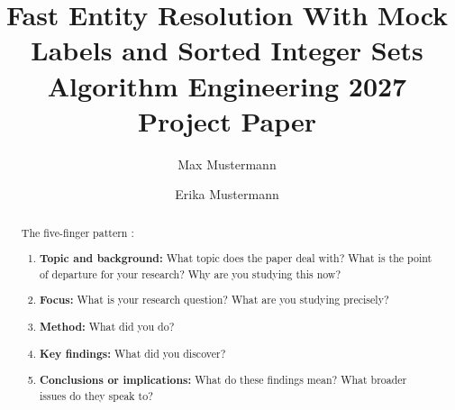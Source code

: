 \documentclass[sigconf]{acmart}
\begin{document}
\title[Fast Entity Resolution With Mock Labels and Sorted Integer Sets]{Fast Entity Resolution With Mock Labels and Sorted Integer Sets\\\large Algorithm Engineering 2027 Project Paper}


\author{Max Mustermann}

\author{Erika Mustermann}

\begin{abstract}

The five-finger pattern \cite{macgilchrist2014}:
\begin{enumerate}
\item \textbf{Topic and background:} What topic does the paper deal with? What is the point of departure for your research? Why are you studying this now?
\item \textbf{Focus:} What is your research question? What are you studying precisely?
\item \textbf{Method:} What did you do?
\item \textbf{Key findings:} What did you discover?
\item \textbf{Conclusions or implications:} What do these findings mean? What broader issues do they speak to?
\end{enumerate}


\end{abstract}



\maketitle
\end{document}
